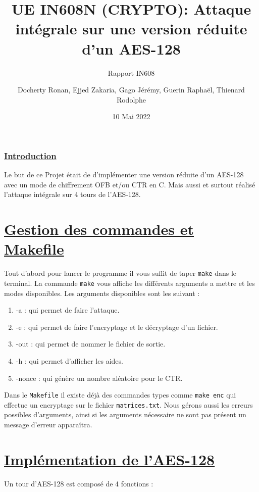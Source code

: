 \documentclass[french, 12pt]{article}
\title{UE IN608N (CRYPTO): Attaque intégrale sur une
	version réduite d’un AES-128 }
\subtitle{Rapport IN608}
\author{\hspace{-2cm}Docherty Ronan, Ejjed Zakaria, Gago Jérémy, Guerin Raphaël, Thienard Rodolphe}
\date{10 Mai 2022}
\begin{document}
	\maketitle
	\newpage
	
	\renewcommand{\contentsname}{Sommaire} 
	\tableofcontents
	
	\newpage

	\section{\underline{Introduction}}

	Le but de ce Projet était de d'implémenter une version réduite d'un AES-128 avec un mode de chiffrement OFB et/ou CTR en C.
	Mais aussi et surtout réalisé l'attaque intégrale sur 4 tours de l'AES-128.
	
	\part{\underline{Gestion des commandes et Makefile}}	
	
	Tout d'abord pour lancer le programme il vous suffit de taper \verb|make| dans le terminal. La commande \verb|make| vous affiche les différents arguments a mettre et les modes disponibles. Les arguments disponibles sont les suivant :
	\begin{enumerate}
		\item -a : qui permet de faire l'attaque.
		\item -e : qui permet de faire l'encryptage et le décryptage d'un fichier.
		\item -out : qui permet de nommer le fichier de sortie.
		\item -h : qui permet d'afficher les aides.
		\item -nonce : qui génère un nombre aléatoire pour le CTR.
	\end{enumerate}
	Dans le \verb|Makefile| il existe déjà des commandes types comme \verb|make enc| qui effectue un encryptage sur le fichier \verb|matrices.txt|.
	Nous gérons aussi les erreurs possibles d'arguments, ainsi si les arguments nécessaire ne sont pas présent un message d'erreur apparaîtra.
	 
	\part{\underline{Implémentation de l'AES-128}}
	
	Un tour d'AES-128 est composé de 4 fonctions : 
	
\end{document}
